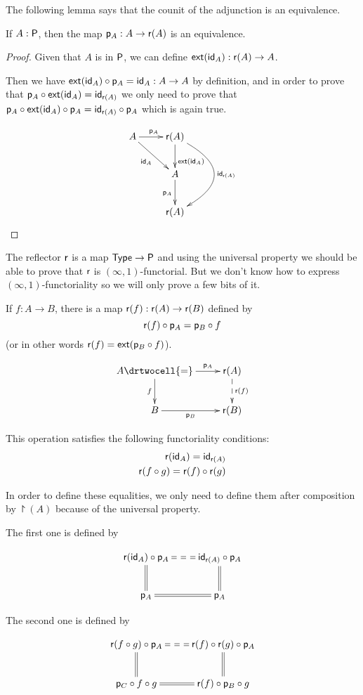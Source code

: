 The following lemma says that the counit of the adjunction is an equivalence.
\begin{lem}
  \label{reflectPequiv}
  If $A:\P$, then the map $\project_A:A\to\reflect(A)$ is an equivalence.
\end{lem}
\begin{proof}
  Given that $A$ is in $\P$, we can define $\ext(\idfunc[A]):\reflect(A)\to{}A$.

  Then we have $\ext(\idfunc[A])\circ\project_A=\idfunc[A]:A\to{}A$ by
  definition, and in order to prove that
  $\project_A\circ\ext(\idfunc[A])=\idfunc[\reflect(A)]$ we only need to prove
  that $\project_A\circ\ext(\idfunc[A])\circ\project_A=
  \idfunc[\reflect(A)]\circ\project_A$ which is again true.

  \[\xymatrix{
    A \ar^{\project_A}[r] \ar_{\idfunc[A]}[rd] &
    \reflect(A) \ar^>>>{\ext(\idfunc[A])}[d] \ar@/^40pt/^{\idfunc[\reflect(A)]}[dd] \\
    & A \ar_{\project_A}[d] \\
    & \reflect(A)}\]
\end{proof}

The reflector $\reflect$ is a map $\type\to\P$ and using the universal property
we should be able to prove that $\reflect$ is $(\infty,1)$-functorial. But we
don’t know how to express $(\infty,1)$-functoriality so we will only prove a
few bits of it.

\begin{defn}
  If $f:A\to{}B$, there is a map $\reflect(f):\reflect(A)\to\reflect(B)$ defined
  by
  \[\reflect(f)\circ\project_A=\project_B\circ{}f\]
  (or in other words $\reflect(f)=\ext(\project_B\circ{}f)$).

  \[\uppercurveobject{{ }}\lowercurveobject{{ }}\twocellhead{{ }}
  \xymatrix{A \ar^-{\project_A}[r] \ar_-f[d] \drtwocell{=} & \reflect(A)
    \ar@{-->}^-{\reflect(f)}[d]
    \\ B \ar_-{\project_B}[r] & \reflect(B)}\]

  This operation satisfies the following functoriality conditions:
  \begin{align*}
    \reflect(\idfunc[A])=\idfunc[\reflect(A)]\\
    \reflect(f\circ{}g)=\reflect(f)\circ\reflect(g)
  \end{align*}

  In order to define these equalities, we only need to define them after
  composition by $\project(A)$ because of the universal property.

  The first one is defined by

  \[\xymatrix{
    \reflect(\idfunc[A])\circ\project_A \ar@{==}[r] \ar@{=}[d] &
    \idfunc[\reflect(A)]\circ\project_A \ar@{=}[d] \\
    \project_A \ar@{=}[r] & \project_A
  }\]

  The second one is defined by

  \[\xymatrix{
    \reflect(f\circ g)\circ\project_A \ar@{==}[r] \ar@{=}[d] &
    \reflect(f)\circ\reflect(g)\circ\project_A \ar@{=}[d] \\
    \project_C\circ f\circ g \ar@{=}[r] & \reflect(f)\circ\project_B\circ g
  }\]
\end{defn}

